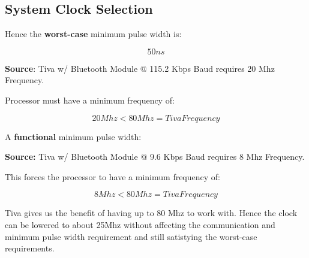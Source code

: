 	\subsection{System Clock Selection}
		Hence the \textbf{worst-case} minimum pulse width is: 

					$$ 50ns $$

		\noindent \textbf{Source}: Tiva w/ Bluetooth Module @ 115.2 Kbps Baud
		requires 20 Mhz Frequency.

		\noindent Processor must have a minimum frequency of:
			
			$$ 20 Mhz < 80Mhz  = Tiva Frequency $$


		\noindent A \textbf{functional} minimum pulse width:

		\noindent \textbf{Source:} Tiva w/ Bluetooth Module @ 9.6 Kbps Baud requires 8 Mhz Frequency.

		\noindent This forces the processor to have a minimum frequency of:
				
				\textbf{$$ 8 Mhz <  80Mhz = Tiva Frequency $$}

		\noindent Tiva gives us the benefit of having up to 80 Mhz to work with. Hence the clock can be
		lowered to about 25Mhz without affecting the communication  and minimum pulse width requirement and
		still satistying the worst-case requirements.

\newpage